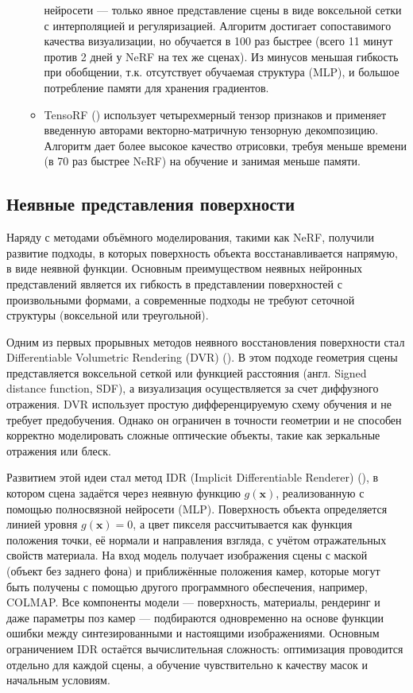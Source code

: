 \begin{itemize}
\begin{itemize}
		нейросети — только явное представление сцены в виде воксельной сетки с
		интерполяцией и регуляризацией. Алгоритм достигает сопоставимого качества
		визуализации, но обучается в 100 раз быстрее (всего 11 минут против 2 дней у
		NeRF на тех же сценах). Из минусов меньшая гибкость при обобщении, т.к.
		отсутствует обучаемая структура (MLP), и большое потребление памяти для
		хранения градиентов.
		\item TensoRF (\cite{chen2022tensorftensorialradiancefields}) использует
		четырехмерный тензор признаков и применяет введенную авторами
		векторно-матричную тензорную декомпозицию. Алгоритм дает более высокое качество отрисовки,
		требуя меньше времени (в 70 раз быстрее NeRF) на обучение и занимая меньше памяти.
	\end{itemize}
\end{itemize}

\subsection{Неявные представления поверхности}

Наряду с методами объёмного моделирования, такими как NeRF, получили развитие
подходы, в которых поверхность объекта восстанавливается напрямую, в виде
неявной функции. Основным преимуществом неявных нейронных представлений является
их гибкость в представлении поверхностей с произвольными формами,
а современные подходы не требуют сеточной структуры (воксельной или треугольной).

Одним из первых прорывных методов неявного восстановления поверхности стал
Differentiable Volumetric Rendering (DVR)
(\cite{niemeyer2020differentiablevolumetricrenderinglearning}). В этом подходе
геометрия сцены представляется воксельной сеткой или функцией расстояния (англ.
Signed distance function, SDF), а визуализация осуществляется за счет диффузного
отражения. DVR использует простую дифференцируемую схему обучения и не требует
предобучения.  Однако он ограничен в точности геометрии и не способен корректно
моделировать сложные оптические объекты, такие как зеркальные отражения или блеск.

Развитием этой идеи стал метод IDR (Implicit Differentiable Renderer)
(\cite{yariv2020multiviewneuralsurfacereconstruction}), в котором сцена задаётся
через неявную функцию $g(\mathbf{x})$, реализованную с помощью полносвязной
нейросети (MLP). Поверхность объекта определяется линией уровня $g(\mathbf{x}) =
0$, а цвет пикселя рассчитывается как функция положения точки, её нормали и
направления взгляда, с учётом отражательных свойств материала. На вход модель
получает изображения сцены с маской (объект без заднего фона) и приближённые
положения камер, которые могут быть получены с помощью другого программного
обеспечения, например, COLMAP. Все компоненты модели — поверхность, материалы,
рендеринг и даже параметры поз камер — подбираются одновременно на основе
функции ошибки между синтезированными и настоящими изображениями. Основным
ограничением IDR остаётся вычислительная сложность: оптимизация проводится
отдельно для каждой сцены, а обучение чувствительно к качеству масок и начальным
условиям.

